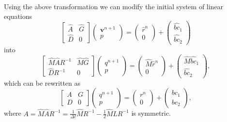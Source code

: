 \documentclass{article}
\begin{document}
Using the above transformation we can modify the initial system of linear equations
\begin{equation}
\left[\begin{array}{ccc}
\hat{A} & \hat{G} \\
\hat{D} & 0 
\end{array}\right]\left(\begin{array}{c}
\boldsymbol{v}^{n+1} \\
p
\end{array}\right)=\left(\begin{array}{c}
\hat{r}^n \\
0 
\end{array}\right)+\left(\begin{array}{c}
\widehat{bc}_1 \\
\widehat{bc}_2 
\end{array}\right)
\end{equation}
into 
\begin{equation}
\left[\begin{array}{cc}
\hat{M}\hat{A}R^{-1} & \hat{M}\hat{G} \\
\hat{D}R^{-1} & 0
\end{array}\right]\left(\begin{array}{c}
q^{n+1} \\
p
\end{array}\right)=\left(\begin{array}{c}
\hat{M}\hat{r}^n \\
0
\end{array}\right)+\left(\begin{array}{c}
\hat{M}\widehat{b c}_1 \\
\widehat{b c}_2
\end{array}\right),
\end{equation}
which can be rewritten as 
\begin{equation}\label{eqn:nse-normalized}
\left[\begin{array}{cc}
A & G \\
D & 0
\end{array}\right]\left(\begin{array}{c}
q^{n+1} \\
p
\end{array}\right)=\left(\begin{array}{c}
r^n \\
0
\end{array}\right)+\left(\begin{array}{c}
{b c}_1 \\
{b c}_2
\end{array}\right),
\end{equation}
where $A=\hat{M}\hat{A}R^{-1}=\frac{1}{\Delta t}\hat{M}R^{-1}-\frac{1}{2}\hat{M}\hat{L}R^{-1}$ is symmetric. 
\end{document}
